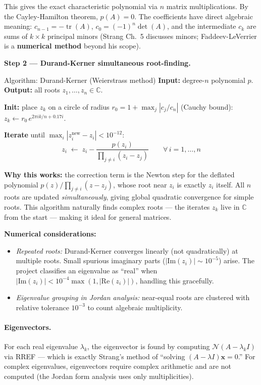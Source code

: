 \documentclass[12pt, a4paper]{article}
\newcommand{\C}{\mathbb{C}}
\newcommand{\Null}{\mathcal{N}}
\newcommand{\trace}{\operatorname{tr}}
\begin{document}
This gives the exact characteristic polynomial via $n$ matrix multiplications.
By the Cayley-Hamilton theorem, $p(A) = 0$.  The coefficients have direct
algebraic meaning: $c_{n-1} = -\trace(A)$, $c_0 = (-1)^n \det(A)$, and the
intermediate $c_k$ are sums of $k \times k$ principal minors (Strang Ch.\ 5
discusses minors; Faddeev-LeVerrier is a \textbf{numerical method} beyond his
scope).

\medskip\noindent\textbf{Step 2 --- Durand-Kerner simultaneous root-finding.}\par\medskip\noindent
\begin{algobox}{Algorithm: Durand-Kerner (Weierstrass method)}
\textbf{Input:} degree-$n$ polynomial $p$.
\quad\textbf{Output:} all roots $z_1,\ldots,z_n \in \C$.

\noindent\textbf{Init:} place $z_k$ on a circle of radius
$r_0 = 1 + \max_j |c_j/c_n|$ (Cauchy bound):
$z_k \leftarrow r_0\,e^{2\pi i k/n + 0.17i}$.

\noindent\textbf{Iterate} until $\max_i |z_i^{\text{new}} - z_i| < 10^{-12}$:
\[
  z_i \;\leftarrow\; z_i - \frac{p(z_i)}{\prod_{j \neq i}(z_i - z_j)}
  \qquad \forall\, i = 1,\ldots,n
\]
\end{algobox}

\textbf{Why this works:} the correction term is the Newton step for the
deflated polynomial $p(z)/\prod_{j \neq i}(z - z_j)$, whose root near $z_i$
is exactly $z_i$ itself.  All $n$ roots are updated \emph{simultaneously},
giving global quadratic convergence for simple roots.  This algorithm naturally
finds complex roots — the iterates $z_k$ live in $\C$ from the start —
making it ideal for general matrices.

\textbf{Numerical considerations:}
\begin{itemize}[noitemsep]
  \item \emph{Repeated roots:} Durand-Kerner converges linearly (not
        quadratically) at multiple roots.  Small spurious imaginary parts
        ($|\text{Im}(z_i)| \sim 10^{-5}$) arise.  The project classifies an
        eigenvalue as ``real'' when $|\text{Im}(z_i)| < 10^{-4}\max(1, |\text{Re}(z_i)|)$,
        handling this gracefully.
  \item \emph{Eigenvalue grouping in Jordan analysis:} near-equal roots are
        clustered with relative tolerance $10^{-3}$ to count algebraic
        multiplicity.
\end{itemize}

\paragraph{Eigenvectors.}  For each real eigenvalue $\lambda_k$, the
eigenvector is found by computing $\Null(A - \lambda_k I)$ via RREF — which
is exactly Strang's method of ``solving $(A - \lambda I)\mathbf{x} = 0$.''
For complex eigenvalues, eigenvectors require complex arithmetic and are not
computed (the Jordan form analysis uses only multiplicities).
\end{document}
